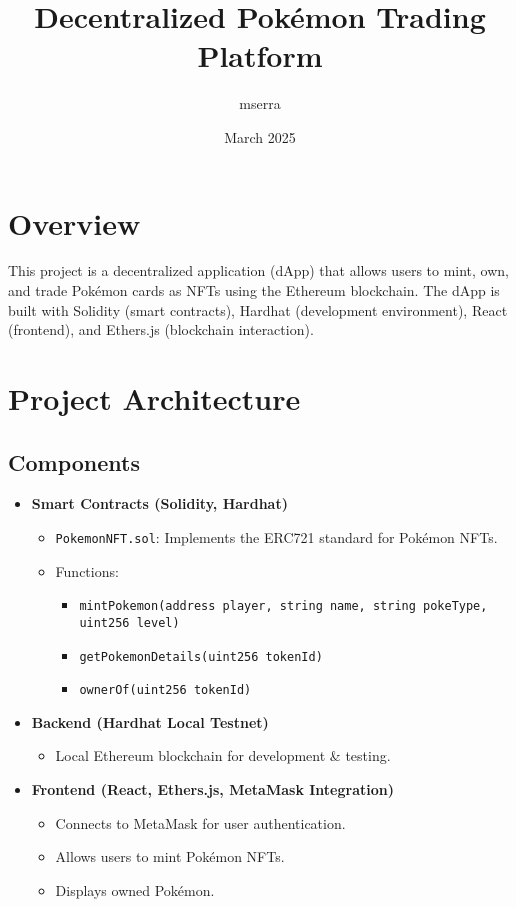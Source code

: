 \documentclass{article}
\title{Decentralized Pokémon Trading Platform}
\author{mserra}
\date{March 2025}
\begin{document}
\maketitle
\tableofcontents
\newpage

\section{Overview}
This project is a decentralized application (dApp) that allows users to mint, own, and trade Pokémon cards as NFTs using the Ethereum blockchain. The dApp is built with Solidity (smart contracts), Hardhat (development environment), React (frontend), and Ethers.js (blockchain interaction).

\section{Project Architecture}
\subsection{Components}
\begin{itemize}
    \item \textbf{Smart Contracts (Solidity, Hardhat)}
    \begin{itemize}
        \item \texttt{PokemonNFT.sol}: Implements the ERC721 standard for Pokémon NFTs.
        \item Functions:
        \begin{itemize}
            \item \texttt{mintPokemon(address player, string name, string pokeType, uint256 level)}
            \item \texttt{getPokemonDetails(uint256 tokenId)}
            \item \texttt{ownerOf(uint256 tokenId)}
        \end{itemize}
    \end{itemize}
    \item \textbf{Backend (Hardhat Local Testnet)}
    \begin{itemize}
        \item Local Ethereum blockchain for development \& testing.
    \end{itemize}
    \item \textbf{Frontend (React, Ethers.js, MetaMask Integration)}
    \begin{itemize}
        \item Connects to MetaMask for user authentication.
        \item Allows users to mint Pokémon NFTs.
        \item Displays owned Pokémon.
    \end{itemize}
\end{itemize}
\end{document}
